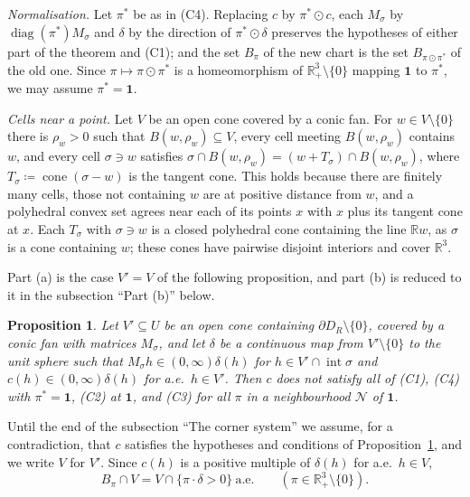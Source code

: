 \documentclass[11pt]{article}
\newcommand{\R}{\mathbb{R}}
\newcommand{\one}{\mathbf{1}}
\DeclareMathOperator{\cone}{cone}
\DeclareMathOperator{\inter}{int}
\theoremstyle{plain}
\newtheorem{proposition}[theorem]{Proposition}
\theoremstyle{definition}
\theoremstyle{remark}
\begin{document}
\emph{Normalisation.} Let $\pi^\ast$ be as in (C4). Replacing $c$ by $\pi^\ast\odot c$,
each $M_\sigma$ by $\operatorname{diag}(\pi^\ast)M_\sigma$ and $\delta$ by the direction of
$\pi^\ast\odot\delta$ preserves the hypotheses of either part of the theorem and (C1); and
the set $B_\pi$ of the new chart is the set $B_{\pi\odot\pi^\ast}$ of the old one. Since
$\pi\mapsto\pi\odot\pi^\ast$ is a homeomorphism of $\R^3_+\setminus\{0\}$ mapping $\one$ to
$\pi^\ast$, we may assume $\pi^\ast=\one$.

\emph{Cells near a point.} Let $V$ be an open cone covered by a conic fan. For $w\in
V\setminus\{0\}$ there is $\rho_w>0$ such that $B(w,\rho_w)\subseteq V$, every cell
meeting $B(w,\rho_w)$ contains $w$, and every cell $\sigma\ni w$ satisfies $\sigma\cap
B(w,\rho_w)=(w+T_\sigma)\cap B(w,\rho_w)$, where $T_\sigma\coloneqq\cone(\sigma-w)$ is the
tangent cone. This holds because there are finitely many cells, those not containing $w$
are at positive distance from $w$, and a polyhedral convex set agrees near each of its
points $x$ with $x$ plus its tangent cone at $x$. Each $T_\sigma$ with $\sigma\ni w$ is a
closed polyhedral cone containing the line $\R w$, as $\sigma$ is a cone containing $w$;
these cones have pairwise disjoint interiors and cover $\R^3$.

Part (a) is the case $V'=V$ of the following proposition, and part (b) is reduced to it in
the subsection ``Part (b)'' below.

\begin{proposition}\label{prop:PLcore}
Let $V'\subseteq U$ be an open cone containing $\partial D_R\setminus\{0\}$, covered by a
conic fan with matrices $M_\sigma$, and let $\delta$ be a continuous map from $V'\setminus
\{0\}$ to the unit sphere such that $M_\sigma h\in(0,\infty)\delta(h)$ for $h\in V'\cap
\inter\sigma$ and $c(h)\in(0,\infty)\delta(h)$ for a.e.\ $h\in V'$. Then $c$ does not
satisfy all of (C1), (C4) with $\pi^\ast=\one$, (C2) at $\one$, and (C3) for all $\pi$ in a
neighbourhood $\mathcal N$ of $\one$.
\end{proposition}

Until the end of the subsection ``The corner system'' we assume, for a contradiction, that $c$
satisfies the hypotheses and conditions of Proposition~\ref{prop:PLcore}, and we write $V$
for $V'$. Since $c(h)$ is a positive multiple of $\delta(h)$ for a.e.\ $h\in V$,
\begin{equation}\label{eq:Bdelta}
  B_\pi\cap V=V\cap\{\pi\cdot\delta>0\}\ \text{a.e.}\qquad(\pi\in\R^3_+\setminus\{0\}).
\end{equation}
\end{document}
